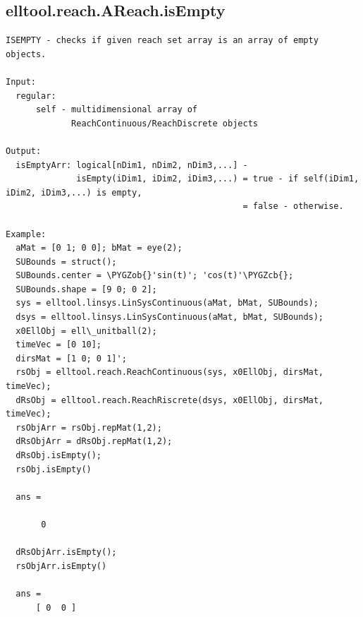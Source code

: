 \documentclass[letterpaper,10pt,english]{sphinxmanual}
\def\PYGZob{\char`\{}
\def\PYGZcb{\char`\}}
\begin{document}
\subsection{elltool.reach.AReach.isEmpty}
\label{chap_functions:elltool-reach-areach-isempty}
\begin{Verbatim}[commandchars=\\\{\}]
ISEMPTY - checks if given reach set array is an array of empty objects.

Input:
  regular:
      self - multidimensional array of
             ReachContinuous/ReachDiscrete objects

Output:
  isEmptyArr: logical[nDim1, nDim2, nDim3,...] -
              isEmpty(iDim1, iDim2, iDim3,...) = true - if self(iDim1, iDim2, iDim3,...) is empty,
                                               = false - otherwise.

Example:
  aMat = [0 1; 0 0]; bMat = eye(2);
  SUBounds = struct();
  SUBounds.center = \PYGZob{}'sin(t)'; 'cos(t)'\PYGZcb{};
  SUBounds.shape = [9 0; 0 2];
  sys = elltool.linsys.LinSysContinuous(aMat, bMat, SUBounds);
  dsys = elltool.linsys.LinSysContinuous(aMat, bMat, SUBounds);
  x0EllObj = ell\_unitball(2);
  timeVec = [0 10];
  dirsMat = [1 0; 0 1]';
  rsObj = elltool.reach.ReachContinuous(sys, x0EllObj, dirsMat, timeVec);
  dRsObj = elltool.reach.ReachRiscrete(dsys, x0EllObj, dirsMat, timeVec);
  rsObjArr = rsObj.repMat(1,2);
  dRsObjArr = dRsObj.repMat(1,2);
  dRsObj.isEmpty();
  rsObj.isEmpty()

  ans =

       0

  dRsObjArr.isEmpty();
  rsObjArr.isEmpty()

  ans =
      [ 0  0 ]
\end{Verbatim}
\end{document}
